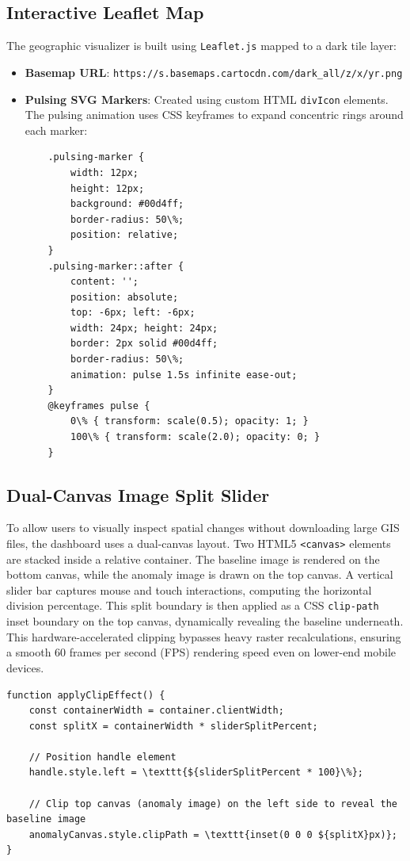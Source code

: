 \subsection{Interactive Leaflet Map}
The geographic visualizer is built using \texttt{Leaflet.js} mapped to a dark tile layer:
\begin{itemize}
  \item \textbf{Basemap URL}: \texttt{https://{s}.basemaps.cartocdn.com/dark\_all/{z}/{x}/{y}{r}.png}
  \item \textbf{Pulsing SVG Markers}: Created using custom HTML \texttt{divIcon} elements. The pulsing animation uses CSS keyframes to expand concentric rings around each marker:
\begin{verbatim}
    .pulsing-marker {
        width: 12px;
        height: 12px;
        background: #00d4ff;
        border-radius: 50\%;
        position: relative;
    }
    .pulsing-marker::after {
        content: '';
        position: absolute;
        top: -6px; left: -6px;
        width: 24px; height: 24px;
        border: 2px solid #00d4ff;
        border-radius: 50\%;
        animation: pulse 1.5s infinite ease-out;
    }
    @keyframes pulse {
        0\% { transform: scale(0.5); opacity: 1; }
        100\% { transform: scale(2.0); opacity: 0; }
    }
\end{verbatim}

\end{itemize}
\subsection{Dual-Canvas Image Split Slider}
To allow users to visually inspect spatial changes without downloading large GIS files, the dashboard uses a dual-canvas layout. Two HTML5 \texttt{<canvas>} elements are stacked inside a relative container. The baseline image is rendered on the bottom canvas, while the anomaly image is drawn on the top canvas. A vertical slider bar captures mouse and touch interactions, computing the horizontal division percentage. This split boundary is then applied as a CSS \texttt{clip-path} inset boundary on the top canvas, dynamically revealing the baseline underneath. This hardware-accelerated clipping bypasses heavy raster recalculations, ensuring a smooth 60 frames per second (FPS) rendering speed even on lower-end mobile devices.

\begin{verbatim}
function applyClipEffect() {
    const containerWidth = container.clientWidth;
    const splitX = containerWidth * sliderSplitPercent;
    
    // Position handle element
    handle.style.left = \texttt{${sliderSplitPercent * 100}\%};
    
    // Clip top canvas (anomaly image) on the left side to reveal the baseline image
    anomalyCanvas.style.clipPath = \texttt{inset(0 0 0 ${splitX}px)};
}
\end{verbatim}

